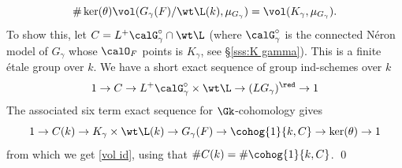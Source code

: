\begin{equation}\label{vol id}
\#\ker(\theta)\vol(G_{\gamma}(F)/\wt\L(k),\mu_{G_{\gamma}})=\vol(K_{\gamma},\mu_{G_{\gamma}}).
\end{equation}
To show this, let $C=L^{+}\calG^{\circ}_{\gamma}\cap \wt\L$ (where $\calG^{\circ}_{\gamma}$ is the connected N\'eron model of $G_{\gamma}$ whose $\calO_{F}$ points is $K_{\gamma}$, see \S\ref{sss:K gamma}). This is a finite \'etale group over $k$. We have a short exact  sequence of group ind-schemes over $k$
\begin{equation*}
1\to C\to L^{+}\calG^{\circ}_{\gamma}\times\wt\L\to (LG_{\gamma})^{\red}\to 1
\end{equation*}
The associated six term exact sequence for $\Gk$-cohomology gives
\begin{equation*}
1\to C(k)\to K_{\gamma}\times \wt\L(k)\to G_{\gamma}(F)\to \cohog{1}{k,C}\to \ker(\theta)\to1
\end{equation*}
from which we get \eqref{vol id}, using that $\#C(k)=\#\cohog{1}{k,C}$. \qed



